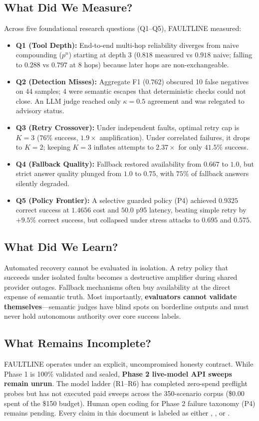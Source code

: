\subsection{What Did We Measure?}
Across five foundational research questions (Q1--Q5), FAULTLINE measured:
\begin{itemize}
    \item \textbf{Q1 (Tool Depth):} End-to-end multi-hop reliability diverges from naive compounding ($p^n$) starting at depth 3 ($0.818$ measured vs $0.918$ naive; falling to $0.288$ vs $0.797$ at 8 hops) because later hops are non-exchangeable.
    \item \textbf{Q2 (Detection Misses):} Aggregate F1 ($0.762$) obscured 10 false negatives on 44 samples; 4 were semantic escapes that deterministic checks could not close. An LLM judge reached only $\kappa = 0.5$ agreement and was relegated to advisory status.
    \item \textbf{Q3 (Retry Crossover):} Under independent faults, optimal retry cap is $K=3$ ($76\%$ success, $1.9\times$ amplification). Under correlated failures, it drops to $K=2$; keeping $K=3$ inflates attempts to $2.37\times$ for only $41.5\%$ success.
    \item \textbf{Q4 (Fallback Quality):} Fallback restored availability from $0.667$ to $1.0$, but strict answer quality plunged from $1.0$ to $0.75$, with $75\%$ of fallback answers silently degraded.
    \item \textbf{Q5 (Policy Frontier):} A selective guarded policy (P4) achieved $0.9325$ correct success at $1.4656$ cost and $50.0$ p95 latency, beating simple retry by $+9.5\%$ correct success, but collapsed under stress attacks to $0.695$ and $0.575$.
\end{itemize}

\subsection{What Did We Learn?}
Automated recovery cannot be evaluated in isolation. A retry policy that succeeds under isolated faults becomes a destructive amplifier during shared provider outages. Fallback mechanisms often buy availability at the direct expense of semantic truth. Most importantly, \textbf{evaluators cannot validate themselves}---semantic judges have blind spots on borderline outputs and must never hold autonomous authority over core success labels.

\subsection{What Remains Incomplete?}
FAULTLINE operates under an explicit, uncompromised honesty contract. While Phase 1 is 100\% validated and sealed, \textbf{Phase 2 live-model API sweeps remain unrun}. The model ladder (R1--R6) has completed zero-spend preflight probes but has not executed paid sweeps across the 350-scenario corpus (\$0.00 spent of the \$150 budget). Human open coding for Phase 2 failure taxonomy (P4) remains pending. Every claim in this document is labeled as either \STATUSVALIDATED, \STATUSCOMPLETED, or \STATUSDECIDED.

